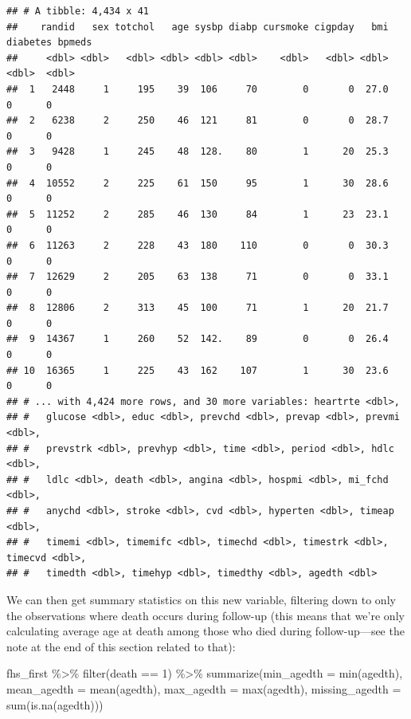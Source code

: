 \documentclass[
]{book}
\newenvironment{Shaded}{\begin{snugshade}}{\end{snugshade}}
\newcommand{\AttributeTok}[1]{\textcolor[rgb]{0.77,0.63,0.00}{#1}}
\newcommand{\DecValTok}[1]{\textcolor[rgb]{0.00,0.00,0.81}{#1}}
\newcommand{\FunctionTok}[1]{\textcolor[rgb]{0.00,0.00,0.00}{#1}}
\newcommand{\NormalTok}[1]{#1}
\newcommand{\SpecialCharTok}[1]{\textcolor[rgb]{0.00,0.00,0.00}{#1}}
\begin{document}
\begin{verbatim}
## # A tibble: 4,434 x 41
##    randid   sex totchol   age sysbp diabp cursmoke cigpday   bmi diabetes bpmeds
##     <dbl> <dbl>   <dbl> <dbl> <dbl> <dbl>    <dbl>   <dbl> <dbl>    <dbl>  <dbl>
##  1   2448     1     195    39  106     70        0       0  27.0        0      0
##  2   6238     2     250    46  121     81        0       0  28.7        0      0
##  3   9428     1     245    48  128.    80        1      20  25.3        0      0
##  4  10552     2     225    61  150     95        1      30  28.6        0      0
##  5  11252     2     285    46  130     84        1      23  23.1        0      0
##  6  11263     2     228    43  180    110        0       0  30.3        0      0
##  7  12629     2     205    63  138     71        0       0  33.1        0      0
##  8  12806     2     313    45  100     71        1      20  21.7        0      0
##  9  14367     1     260    52  142.    89        0       0  26.4        0      0
## 10  16365     1     225    43  162    107        1      30  23.6        0      0
## # ... with 4,424 more rows, and 30 more variables: heartrte <dbl>,
## #   glucose <dbl>, educ <dbl>, prevchd <dbl>, prevap <dbl>, prevmi <dbl>,
## #   prevstrk <dbl>, prevhyp <dbl>, time <dbl>, period <dbl>, hdlc <dbl>,
## #   ldlc <dbl>, death <dbl>, angina <dbl>, hospmi <dbl>, mi_fchd <dbl>,
## #   anychd <dbl>, stroke <dbl>, cvd <dbl>, hyperten <dbl>, timeap <dbl>,
## #   timemi <dbl>, timemifc <dbl>, timechd <dbl>, timestrk <dbl>, timecvd <dbl>,
## #   timedth <dbl>, timehyp <dbl>, timedthy <dbl>, agedth <dbl>
\end{verbatim}

We can then get summary statistics on this new variable, filtering down to only the observations where death occurs during follow-up (this means that we're only calculating average age at death among those who died during follow-up---see the note at the end of this section related to that):

\begin{Shaded}
\begin{Highlighting}[]
\NormalTok{fhs\_first }\SpecialCharTok{\%\textgreater{}\%} 
  \FunctionTok{filter}\NormalTok{(death }\SpecialCharTok{==} \DecValTok{1}\NormalTok{) }\SpecialCharTok{\%\textgreater{}\%} 
  \FunctionTok{summarize}\NormalTok{(}\AttributeTok{min\_agedth =} \FunctionTok{min}\NormalTok{(agedth),}
            \AttributeTok{mean\_agedth =} \FunctionTok{mean}\NormalTok{(agedth),}
            \AttributeTok{max\_agedth =} \FunctionTok{max}\NormalTok{(agedth),}
            \AttributeTok{missing\_agedth =} \FunctionTok{sum}\NormalTok{(}\FunctionTok{is.na}\NormalTok{(agedth)))}
\end{Highlighting}
\end{Shaded}
\end{document}
